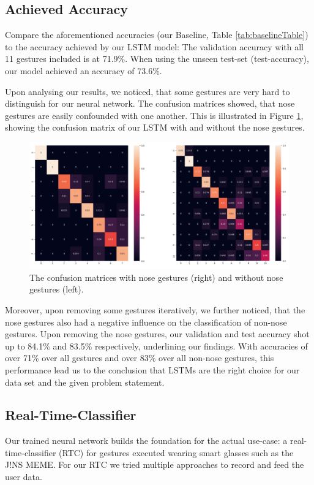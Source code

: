 \documentclass[runningheads]{llncs}
\begin{document}
\subsection{Achieved Accuracy}
Compare the aforementioned accuracies (our Baseline, Table \ref{tab:baselineTable}) to the accuracy achieved by our LSTM model:
 The validation accuracy with all 11 gestures included is at 71.9\%. When using the unseen test-set (test-accuracy), our model achieved an accuracy of 73.6\%. 
 
 Upon analysing our results, we noticed, that some gestures are very hard to distinguish for our neural network. The confusion matrices showed, that nose gestures are easily confounded with one another. This is illustrated in Figure \ref{fig:confMat}, showing the confusion matrix of our LSTM with and without the nose gestures. 
\begin{figure}
\centering
\includegraphics[width=\textwidth]{confusionMatrices.png}
\caption{The confusion matrices with nose gestures (right) and without nose gestures (left).}
\label{fig:confMat}
\end{figure}
 Moreover, upon removing some gestures iteratively, we further noticed, that the nose gestures also had a negative influence on the classification of non-nose gestures. Upon removing the nose gestures, our validation and test accuracy shot up to 84.1\% and 83.5\% respectively, underlining our findings. With accuracies of over 71\% over all gestures and over 83\% over all non-nose gestures, this performance lead us to the conclusion that LSTMs are the right choice for our data set and the given problem statement. %

\subsection{Real-Time-Classifier}
Our trained neural network builds the foundation for the actual use-case: a real-time-classifier (RTC) for gestures executed wearing smart glasses such as the J!NS MEME. For our RTC we tried multiple approaches to record and feed the user data.
\end{document}
